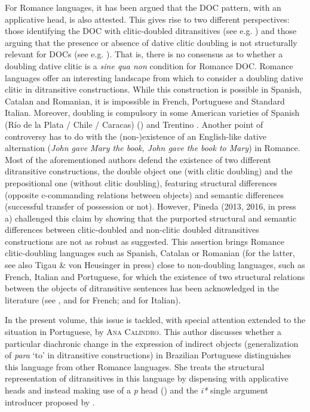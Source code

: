 \documentclass[output=paper,modfonts,nonflat,colorlinks,citecolor=brown]{langsci/langscibook}
\begin{document}
For Romance languages, it has been argued that the DOC pattern, with an applicative head, is also attested. This gives rise to two different perspectives: those identifying the DOC with clitic-doubled ditransitives (see e.g. \citealt{Cuervo2003}) and those arguing that the presence or absence of dative clitic doubling is not structurally relevant for DOCs (see e.g. \citealt{Pineda2013, Pineda2016, PinedaPress}). That is, there is no consensus as to whether a doubling dative clitic is a {\textit{sine qua non}} condition for Romance DOC. Romance languages offer an interesting landscape from which to consider a doubling dative clitic in ditransitive constructions. While this construction is possible in Spanish, Catalan and Romanian, it is impossible in French, Portuguese and Standard Italian. Moreover, doubling is compulsory in some American varieties of Spanish (Río de la Plata / Chile / Caracas) (\citealt{Parodi1998,Senn2008,Pujalte2009}) and Trentino \citep{Cordin1993}. Another point of controversy has to do with the (non-)existence of an English-like dative alternation (\textit{John gave Mary the book, John gave the book to Mary}) in Romance. Most of the aforementioned authors defend the existence of two different ditransitive constructions, the double object one (with clitic doubling) and the prepositional one (without clitic doubling), featuring structural differences (opposite c-commanding relations between objects) and semantic differences (successful transfer of possession or not). However, Pineda (2013, 2016, in press a) challenged this claim by showing that the purported structural and semantic differences between clitic-doubled and non-clitic doubled ditransitives constructions are not as robust as suggested. This assertion brings Romance clitic-doubling languages such as Spanish, Catalan or Romanian (for the latter, see also Tigau \& von Heusinger in press) close to non-doubling languages, such as French, Italian and Portuguese, for which the existence of two structural relations between the objects of ditransitive sentences has been acknowledged in the literature (see \citealt{Harley2002,Anagnostopoulou2003,Fournier2010}, and \citealt{BonehNash2011} for French; and \citealt{GiorgiLongobardi1991,McGinnis2001,Harley2002} for Italian). 



In the present volume, this issue is tackled, with special attention extended to the situation in Portuguese, by {\textsc{Ana Calindro.}}  This author discusses whether a particular diachronic change in the expression of indirect objects (generalization of {\textit{para}} ‘to’ in ditransitive constructions) in Brazilian Portuguese distinguishes this language from other Romance languages. She treats the structural representation of ditransitives in this language by dispensing with applicative heads and instead making use of a {\textit{p}} head (\citealt{Svenonius2003, Svenonius20014, Wood2012}) and the {\textit{i*}} single argument introducer proposed by \citet{WoodMarantz2017}. 
\end{document}
